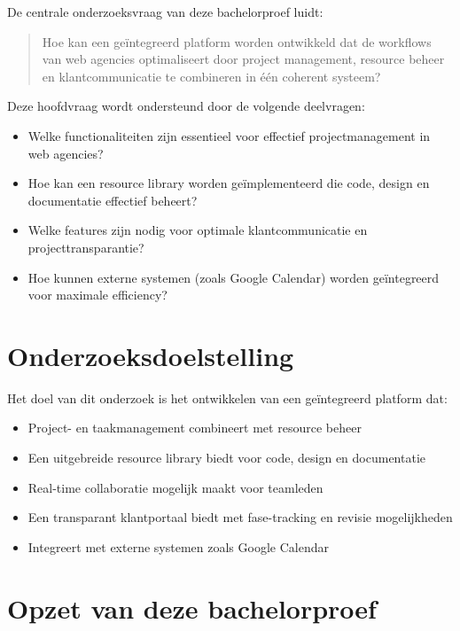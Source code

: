 De centrale onderzoeksvraag van deze bachelorproef luidt:

\begin{quote}
    Hoe kan een geïntegreerd platform worden ontwikkeld dat de workflows van web agencies optimaliseert door project management, resource beheer en klantcommunicatie te combineren in één coherent systeem?
\end{quote}

Deze hoofdvraag wordt ondersteund door de volgende deelvragen:

\begin{itemize}
    \item Welke functionaliteiten zijn essentieel voor effectief projectmanagement in web agencies?
    \item Hoe kan een resource library worden geïmplementeerd die code, design en documentatie effectief beheert?
    \item Welke features zijn nodig voor optimale klantcommunicatie en projecttransparantie?
    \item Hoe kunnen externe systemen (zoals Google Calendar) worden geïntegreerd voor maximale efficiency?
\end{itemize}

\section{Onderzoeksdoelstelling}
\label{sec:onderzoeksdoelstelling}

Het doel van dit onderzoek is het ontwikkelen van een geïntegreerd platform dat:

\begin{itemize}
    \item Project- en taakmanagement combineert met resource beheer
    \item Een uitgebreide resource library biedt voor code, design en documentatie
    \item Real-time collaboratie mogelijk maakt voor teamleden
    \item Een transparant klantportaal biedt met fase-tracking en revisie mogelijkheden
    \item Integreert met externe systemen zoals Google Calendar
\end{itemize}

\section{Opzet van deze bachelorproef}
\label{sec:opzet}

